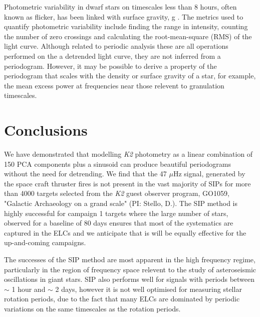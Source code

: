 \documentclass[useAMS, usenatbib]{aastex}
\begin{document}
Photometric variability in dwarf stars on timescales less than 8 hours, often
known as flicker, has been linked with surface gravity, g
\citep[][]{Bastien2013, Kipping2014}.
The metrics used to quantify photometric variability include finding the range
in intensity, counting the number of zero crossings and calculating the
root-mean-square (RMS) of the light curve.
Although related to periodic analysis these are all operations performed on the
a detrended light curve, they are not inferred from a periodogram.
However, it may be possible to derive a property of the periodogram that scales
with the density or surface gravity of a star, for example, the mean excess
power at frequencies near those relevent to granulation timescales.

\section{Conclusions}
We have demonstrated that modelling {\it K2} photometry as a linear combination
of 150 PCA components plus a sinusoid can produce beautiful periodograms
without the need for detrending.
We find that the 47 $\mu$Hz signal, generated by the space craft thruster
fires is not present in the vast majority of SIPs for more than 4000 targets
selected from the {\it K2} guest observer program, GO1059, "Galactic
Archaeology on a grand scale" (PI: Stello, D.).
The SIP method is highly successful for campaign 1 targets where the large
number of stars, observed for a baseline of 80 days ensures that most of the
systematics are captured in the ELCs and we anticipate that is will
be equally effective for the up-and-coming campaigns.

The successes of the SIP method are most apparent in the high frequency regime,
particularly in the region of frequency space relevent to the study of
asteroseismic oscillations in giant stars.
SIP also performs well for signals with periods between $\sim$ 1 hour and
$\sim$ 2 days, however it is not well optimised for measuring stellar rotation
periods, due to the fact that many ELCs are dominated by periodic variations
on the same timescales as the rotation periods.
\end{document}
